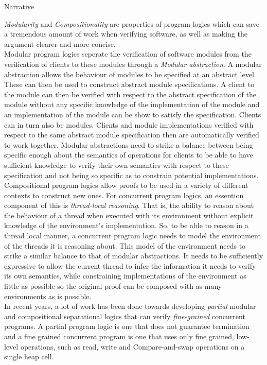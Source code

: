 \documentclass{article}
\begin{document}
\begin{section}{Narrative}

  \emph{Modularity} and \emph{Compositionality} are properties of program logics which can save a tremendous amount of work when verifying software, as well as making the argument clearer and more concise. \\

  Modular program logics seperate the verification of software modules from the verification of clients to these modules through a \emph{Modular abstraction}. A modular abstraction allows the behaviour of modules to be specified at an abstract level. These can then be used to construct abstract module specifications. A client to the module can then be verified with respect to the abstract specification of the module without any specific knowledge of the implementation of the module and an implementation of the module can be show to satisfy the specification. Clients can in turn also be modules. Clients and module implementations verified with respect to the same abstract module specification then are automatically verified to work together. Modular abstractions need to strike a balance between being specific enough about the semantics of operations for clients to be able to have sufficient knowledge to verify their own semantics with respect to these specification and not being so specific as to constrain potential implementations. \\

  Compositional program logics allow proofs to be used in a variety of different contexts to construct new ones. For concurrent program logics, an essention component of this is \emph{thread-local reasoning}. That is, the ability to reason about the behaviour of a thread when executed with its environment without explicit knowledge of the environment's implementation. So, to be able to reason in a thread local manner, a concurrent program logic needs to model the environment of the threads it is reasoning about. This model of the environment needs to strike a similar balance to that of modular abstractions. It needs to be sufficiently expressive to allow the current thread to infer the information it needs to verify its own semantics, while constraining implementations of the environment as little as possible so the original proof can be composed with as many environments as is possible. \\


  In recent years, a lot of work has been done towards developing \emph{partial} modular and compositional separational logics that can verify \emph{fine-grained} concurrent programs. A partial program logic is one that does not guarantee termination and a fine grained concurrent program is one that uses only fine grained, low-level operations, such as read, write and Compare-and-swap operations on a single heap cell. \\


\end{section}
\end{document}
